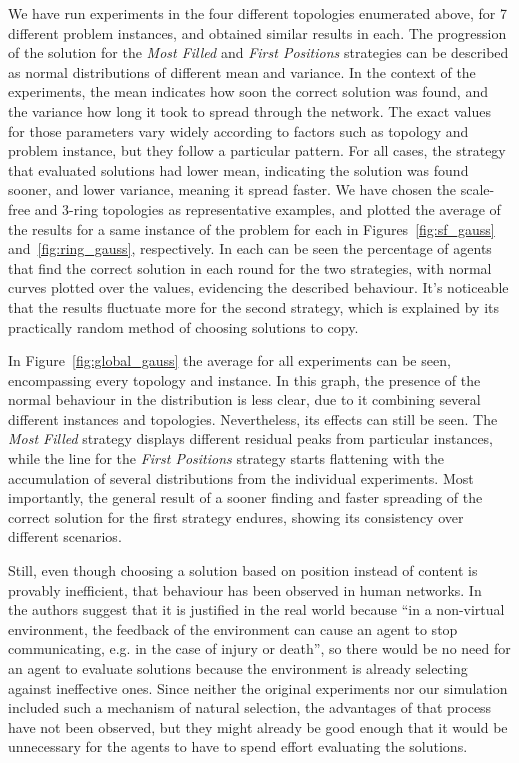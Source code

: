 \documentclass{article}
\begin{document}
We have run experiments in the four different topologies enumerated above, for 7 different problem instances, and obtained similar results in each. The progression of the solution for the \emph{Most Filled} and \emph{First Positions} strategies can be described as normal distributions of different mean and variance. In the context of the experiments, the mean indicates how soon the correct solution was found, and the variance how long it took to spread through the network. The exact values for those parameters vary widely according to factors such as topology and problem instance, but they follow a particular pattern. For all cases, the strategy that evaluated solutions had lower mean, indicating the solution was found sooner, and lower variance, meaning it spread faster. We have chosen the scale-free and 3-ring topologies as representative examples, and plotted the average of the results for a same instance of the problem for each in Figures~\ref{fig:sf_gauss} and~\ref{fig:ring_gauss}, respectively. In each can be seen the percentage of agents that find the correct solution in each round for the two strategies, with normal curves plotted over the values, evidencing the described behaviour. It's noticeable that the results fluctuate more for the second strategy, which is explained by its practically random method of choosing solutions to copy.

In Figure~\ref{fig:global_gauss} the average for all experiments can be seen, encompassing every topology and instance. In this graph, the presence of the normal behaviour in the distribution is less clear, due to it combining several different instances and topologies. Nevertheless, its effects can still be seen. The \emph{Most Filled} strategy displays different residual peaks from particular instances, while the line for the \emph{First Positions} strategy starts flattening with the accumulation of several distributions from the individual experiments. Most importantly, the general result of a sooner finding and faster spreading of the correct solution for the first strategy endures, showing its consistency over different scenarios.

Still, even though choosing a solution based on position instead of content is provably inefficient, that behaviour has been observed in human networks. In~\cite{farenzena:collabem} the authors suggest that it is justified in the real world because ``in a non-virtual environment, the feedback of the environment can cause an agent to stop communicating, e.g. in the case of injury or death'', so there would be no need for an agent to evaluate solutions because the environment is already selecting against ineffective ones. Since neither the original experiments nor our simulation included such a mechanism of natural selection, the advantages of that process have not been observed, but they might already be good enough that it would be unnecessary for the agents to have to spend effort evaluating the solutions.
\end{document}
